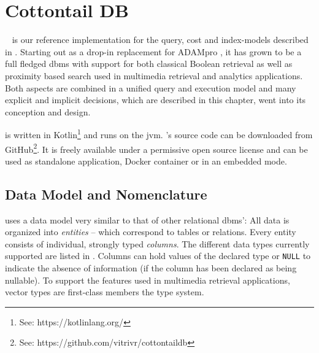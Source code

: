 \chapter{Cottontail DB}

\label{chapter:cottontaildb}

\cottontail{}~\cite{Gasser:2020Cottontail} is our reference implementation for the query, cost and index-models described in . Starting out as a drop-in replacement for ADAMpro \cite{Giangreco:2016Adam}, it has grown to be a full fledged \acrshort{dbms} with support for both classical Boolean retrieval as well as proximity based search used in multimedia retrieval and analytics applications. Both aspects are combined in a unified query and execution model and many explicit and implicit decisions, which are described in this chapter, went into its conception and design.

\cottontail{} is written in Kotlin\footnote{See: https://kotlinlang.org/} and runs on the \acrfull{jvm}. \cottontail{}'s source code can be downloaded from GitHub\footnote{See: https://github.com/vitrivr/cottontaildb}. It is freely available under a permissive open source license and can be used as standalone application, Docker container or in an embedded mode.

\section{Data Model and Nomenclature} 

\cottontail{} uses a data model very similar to that of other relational \acrshort{dbms}': All data is organized into \emph{entities} -- which correspond to tables or relations. Every entity consists of individual, strongly typed \emph{columns}. The different data types currently supported are listed in . Columns can hold values of the declared type or \texttt{NULL} to indicate the absence of information (if the column has been declared as being nullable). To support the features used in multimedia retrieval applications, vector types are first-class members the type system.

